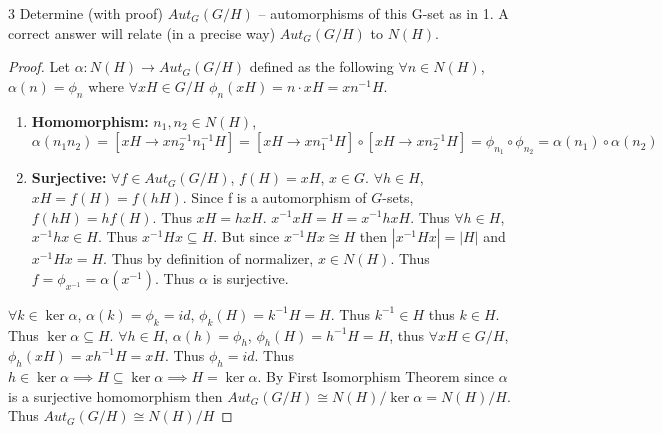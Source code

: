 \documentclass{article}
\begin{document}
\bigskip

\begin{PROB}{3}\label{Problem 3.}
    Determine (with proof) $Aut_G(G/H)$ -- automorphisms of this G-set as in 1.  A correct answer will relate (in a precise way) $Aut_G(G/H)$ to $N(H)$. 
\end{PROB}
\begin{proof}
    Let $\alpha: N(H) \to Aut_G(G/H)$ defined as the following $\forall n \in N(H)$, $\alpha(n) = \phi_n$ where $\forall xH \in G/H$ $\phi_n(xH) = n \cdot xH = xn^{-1}H$. 

    \begin{enumerate}{}
        \item \textbf{Homomorphism: } $n_1, n_2 \in N(H)$, $\alpha(n_1n_2) = [xH \to xn_2^{-1}n_1^{-1}H] = [xH \to xn_1^{-1}H] \circ [xH \to xn_2^{-1}H] = \phi_{n_1} \circ \phi_{n_2} = \alpha(n_1) \circ \alpha(n_2)$
        \item \textbf{Surjective: } $\forall f \in Aut_G(G/H)$, $f(H) = xH$, $x \in G$. $\forall h \in H$, $xH = f(H) = f(hH)$. Since f is a automorphism of $G$-sets, $f(hH) = hf(H)$. Thus $xH = hxH$. $x^{-1}xH = H = x^{-1}hxH$. Thus $\forall h \in H$, $x^{-1}hx \in H$. Thus $x^{-1}Hx \subseteq H$. But since $x^{-1}Hx \cong H$ then $|x^{-1}Hx| = |H|$ and $x^{-1}Hx = H$. Thus by definition of normalizer, $x \in N(H)$. Thus $f = \phi_{x^{-1}} = \alpha(x^{-1})$. Thus $\alpha$ is surjective. 
    \end{enumerate}
    
    $\forall k \in \ker \alpha$, $\alpha(k) = \phi_k = id$, $\phi_k(H) = k^{-1}H = H$. Thus $k^{-1} \in H$ thus $k \in H$. Thus $\ker \alpha \subseteq H$. $\forall h \in H$, $\alpha(h) = \phi_h$, $\phi_h(H) = h^{-1}H = H$, thus $\forall xH \in G/H$, $\phi_h(xH) = xh^{-1}H = xH$. Thus $\phi_h = id$. Thus $h \in \ker \alpha \implies H \subseteq \ker \alpha \implies H = \ker \alpha$. By First Isomorphism Theorem since $\alpha$ is a surjective homomorphism then $Aut_G(G/H) \cong N(H)/\ker \alpha = N(H)/H$. Thus $Aut_G(G/H) \cong N(H)/H$
\end{proof}

\bigskip
\end{document}

